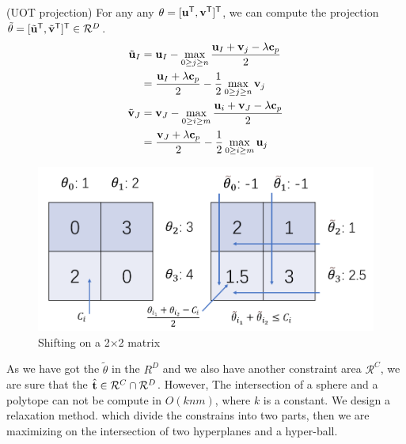 \begin{thm}
(UOT projection) For any any $\theta = [{\mathbf u}^{\mathsf T},{\mathbf v}^{\mathsf T}]^{\mathsf T}$, we can compute the projection $\tilde{\theta} = [\tilde{\mathbf u}^{\mathsf T},\tilde{\mathbf v}^{\mathsf T}]^{\mathsf T} \in \mathcal{R}^{D}$.
\begin{equation}
\begin{split}
\tilde{\mathbf u}_I &= {\mathbf u}_I - \max_{0\geq j\geq n} \frac{{\mathbf u}_I +{\mathbf v}_j - \lambda\mathbf c_{p}}{2}\\
& = \frac{{\mathbf u}_I +\lambda\mathbf c_{p}}{2} - \frac{1}{2}\max_{0\geq j\geq n} {\mathbf v}_j\\
\tilde{\mathbf v}_J &= {\mathbf v}_J - \max_{0 \geq i \geq m} \frac{{\mathbf u}_i +{\mathbf v}_J - \lambda\mathbf c_{p}}{2}\\
& = \frac{{\mathbf v}_J +\lambda\mathbf c_{p}}{2} - \frac{1}{2}\max_{0\geq i\geq m} {\mathbf u}_j
 \end{split}
 \label{eq:uotdual}
\end{equation}
\end{thm}
	\begin{figure}[h]
	\begin{center}	
	\includegraphics[width = \linewidth]{pic/shifting}
	\caption{Shifting on a 2$\times$2 matrix}
	\end{center}	
	\end{figure}


As we have got the $\tilde{\theta}$ in the $R^{D}$ and we also have another constraint area $\mathcal{R}^{C}$, we are sure that the $\hat{\mathbf t} \in \mathcal{R}^{C}\cap\mathcal{R}^{D}$. However, The intersection of a sphere and a polytope can not be compute in $O(knm)$, where $k$ is a constant.  We design a relaxation method. which divide the constrains into two parts, then we are maximizing on the intersection of two hyperplanes and a hyper-ball. 

